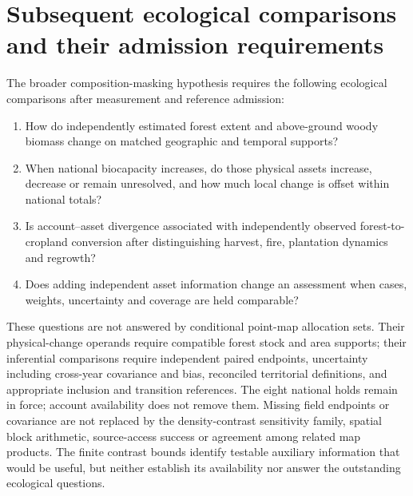 \section{Subsequent ecological comparisons and their admission requirements}
The broader composition-masking hypothesis requires the following ecological comparisons after measurement and reference admission:
\begin{enumerate}
\item How do independently estimated forest extent and above-ground woody biomass change on matched geographic and temporal supports?
\item When national biocapacity increases, do those physical assets increase, decrease or remain unresolved, and how much local change is offset within national totals?
\item Is account--asset divergence associated with independently observed forest-to-cropland conversion after distinguishing harvest, fire, plantation dynamics and regrowth?
\item Does adding independent asset information change an assessment when cases, weights, uncertainty and coverage are held comparable?
\end{enumerate}
These questions are not answered by conditional point-map allocation sets. Their physical-change operands require compatible forest stock and area supports; their inferential comparisons require independent paired endpoints, uncertainty including cross-year covariance and bias, reconciled territorial definitions, and appropriate inclusion and transition references. The eight national holds remain in force; account availability does not remove them. Missing field endpoints or covariance are not replaced by the density-contrast sensitivity family, spatial block arithmetic, source-access success or agreement among related map products. The finite contrast bounds identify testable auxiliary information that would be useful, but neither establish its availability nor answer the outstanding ecological questions.
